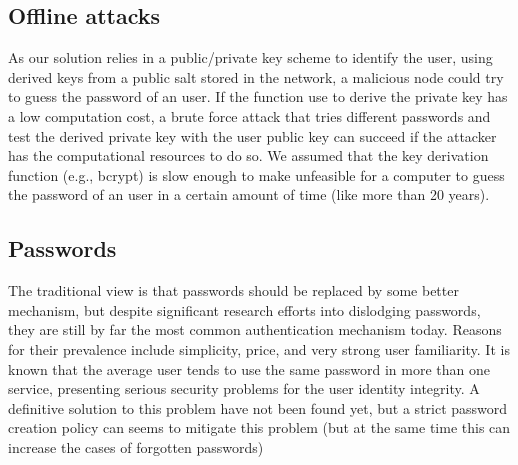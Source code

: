 \subsection{Offline attacks}
As our solution relies in a public/private key scheme to identify the user,
using derived keys from a public salt stored in the network, a malicious node
could try to guess the password of an user. If the function use to derive the
private key has a low computation cost, a brute force attack that tries
different passwords and test the derived private key with the user public key
can succeed if the attacker has the computational resources to do so. We
assumed that the key derivation function (e.g., bcrypt) is slow enough to make
unfeasible for a computer to guess the password of an user in a certain
amount of time (like more than 20 years).

\subsection{Passwords}
The traditional view is that passwords should be replaced by some better
mechanism, but despite significant research efforts into dislodging passwords,
they are still by far the most common authentication mechanism today.
Reasons for their prevalence include simplicity, price, and very strong user
familiarity.
It is known that the average user tends to use the
same password in more than one service, presenting serious security problems
for the user identity integrity. A definitive solution to this problem have not
been found yet, but a strict password creation policy can seems to mitigate this
problem (but at the same time this can increase the cases of forgotten passwords)




%
%

